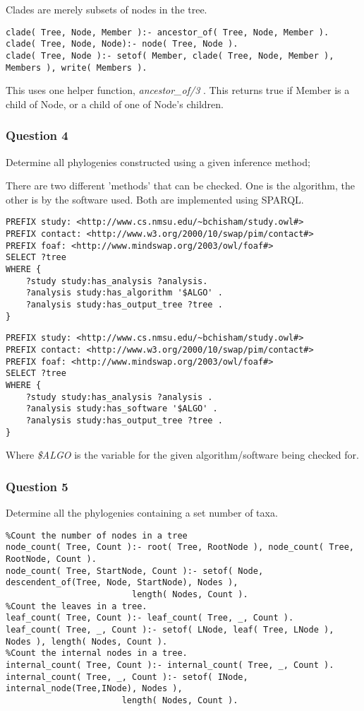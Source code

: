 \documentclass[10pt]{article}
\begin{document}
Clades are merely subsets of nodes in the tree.

\begin{verbatim}
clade( Tree, Node, Member ):- ancestor_of( Tree, Node, Member ).
clade( Tree, Node, Node):- node( Tree, Node ).
clade( Tree, Node ):- setof( Member, clade( Tree, Node, Member ), Members ), write( Members ).
\end{verbatim}

This uses one helper function, \emph{ ancestor\_of/3 }.  This returns true if Member is a child of Node, or a child of one of Node's children.

\subsubsection{Question 4}
Determine all phylogenies constructed using a given inference method;

There are two different 'methods' that can be checked.  One is the algorithm, the other is by the software used.  Both are implemented using SPARQL.

\begin{verbatim}
PREFIX study: <http://www.cs.nmsu.edu/~bchisham/study.owl#>
PREFIX contact: <http://www.w3.org/2000/10/swap/pim/contact#>
PREFIX foaf: <http://www.mindswap.org/2003/owl/foaf#>
SELECT ?tree
WHERE {
    ?study study:has_analysis ?analysis.
    ?analysis study:has_algorithm '$ALGO' .
    ?analysis study:has_output_tree ?tree .
}
\end{verbatim}

\begin{verbatim}
PREFIX study: <http://www.cs.nmsu.edu/~bchisham/study.owl#>
PREFIX contact: <http://www.w3.org/2000/10/swap/pim/contact#>
PREFIX foaf: <http://www.mindswap.org/2003/owl/foaf#>
SELECT ?tree
WHERE {
    ?study study:has_analysis ?analysis .
    ?analysis study:has_software '$ALGO' .
    ?analysis study:has_output_tree ?tree .
}
\end{verbatim}

Where \emph{\$ALGO} is the variable for the given algorithm/software being checked for.

\subsubsection{Question 5}
 Determine all the phylogenies containing a set number of taxa.

\begin{verbatim}
%Count the number of nodes in a tree
node_count( Tree, Count ):- root( Tree, RootNode ), node_count( Tree, RootNode, Count ).
node_count( Tree, StartNode, Count ):- setof( Node, descendent_of(Tree, Node, StartNode), Nodes ),
					     length( Nodes, Count ).
%Count the leaves in a tree.
leaf_count( Tree, Count ):- leaf_count( Tree, _, Count ).
leaf_count( Tree, _, Count ):- setof( LNode, leaf( Tree, LNode ), Nodes ), length( Nodes, Count ).
%Count the internal nodes in a tree.
internal_count( Tree, Count ):- internal_count( Tree, _, Count ).
internal_count( Tree, _, Count ):- setof( INode, internal_node(Tree,INode), Nodes ), 
				       length( Nodes, Count ).
\end{verbatim}
\end{document}
